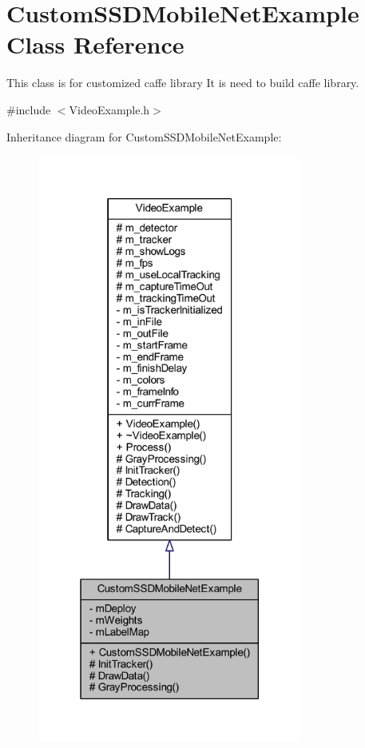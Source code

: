 \hypertarget{class_custom_s_s_d_mobile_net_example}{}\section{Custom\+S\+S\+D\+Mobile\+Net\+Example Class Reference}
\label{class_custom_s_s_d_mobile_net_example}


This class is for customized caffe library It is need to build caffe library.  




{\ttfamily \#include $<$Video\+Example.\+h$>$}



Inheritance diagram for Custom\+S\+S\+D\+Mobile\+Net\+Example\+:\nopagebreak
\begin{figure}[H]
\begin{center}
\leavevmode
\includegraphics[height=550pt]{class_custom_s_s_d_mobile_net_example__inherit__graph}
\end{center}
\end{figure}


